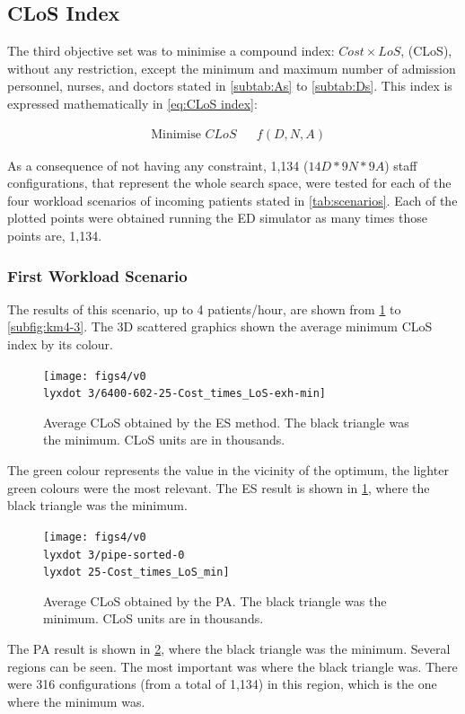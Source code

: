 \documentclass[11pt]{article} %
\begin{document}
\subsection{CLoS Index}

The third objective set was to minimise a compound index: $Cost\times LoS$,
(CLoS), without any restriction, except the minimum and maximum number
of admission personnel, nurses, and doctors stated in \ref{subtab:As}
to \ref{subtab:Ds}. This index is expressed mathematically in \ref{eq:CLoS index}:

\begin{equation}
\begin{aligned} & {\text{Minimise }CLoS} &  & f(D,N,A)\end{aligned}
\label{eq:CLoS index}
\end{equation}


As a consequence of not having any constraint, 1,134 ($14D*9N*9A$)
staff configurations, that represent the whole search space, were
tested for each of the four workload scenarios of incoming patients
stated in \ref{tab:scenarios}. Each of the plotted points were obtained
running the ED simulator as many times those points are, 1,134.


\subsubsection{First Workload Scenario}

The results of this scenario, up to 4 patients/hour, are shown from
\ref{subfig:es4-3} to \ref{subfig:km4-3}. The 3D scattered graphics
shown the average minimum CLoS index by its colour. 
\begin{figure}[H]
\centering{}\texttt{[image: figs4/v0\\lyxdot 3/6400-602-25-Cost\_times\_LoS-exh-min]}\caption{Average CLoS obtained by the ES method. The black triangle was the
minimum. CLoS units are in thousands. \label{subfig:es4-3}}
\end{figure}
The green colour represents the value in the vicinity of the optimum,
the lighter green colours were the most relevant. The ES result is
shown in \ref{subfig:es4-3}, where the black triangle was the minimum. 

\begin{figure}[H]
\centering{}\texttt{[image: figs4/v0\\lyxdot 3/pipe-sorted-0\\lyxdot 25-Cost\_times\_LoS\_min]}\caption{Average CLoS obtained by the PA. The black triangle was the minimum.
CLoS units are in thousands.\label{subfig:pipe4-3}}
\end{figure}
The PA result is shown in \ref{subfig:pipe4-3}, where the black triangle
was the minimum. Several regions can be seen. The most important was
where the black triangle was. There were 316 configurations (from
a total of 1,134) in this region, which is the one where the minimum
was.
\end{document}
